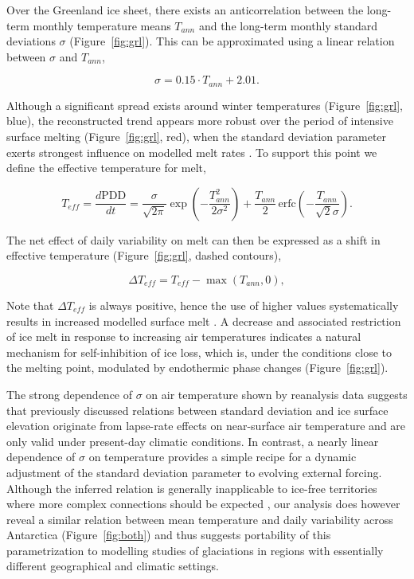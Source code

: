 \documentclass[review]{igs}
\begin{document}
Over the Greenland ice sheet, there exists an anticorrelation between the long-term monthly temperature means $T_{ann}$ and the long-term monthly standard deviations $\sigma$ (Figure~\ref{fig:grl}). This can be approximated using a linear relation between $\sigma$ and $T_{ann}$,

\begin{equation} \label{eq:sigma}
    \sigma = 0.15 \cdot T_{ann} + 2.01.
\end{equation}

Although a significant spread exists around winter temperatures (Figure~\ref{fig:grl}, blue), the reconstructed trend appears more robust over the period of intensive surface melting (Figure~\ref{fig:grl}, red), when the standard deviation parameter exerts strongest influence on modelled melt rates \citep{rogozhina-rau-inpress}. To support this point we define the effective temperature for melt,

\begin{equation} \label{eq:teff}
    T_{eff} = \frac{d\mathrm{PDD}}{dt}
        = \frac{\sigma}{\sqrt{2\pi}} \exp\left({-\frac{T_{ann}^2}{2\sigma^2}}\right)
            + \frac{T_{ann}}{2} \, \mathrm{erfc} \left(-\frac{T_{ann}}{\sqrt{2}\sigma}\right).
\end{equation}

The net effect of daily variability on melt can then be expressed as a shift in effective temperature (Figure~\ref{fig:grl}, dashed contours),

\begin{equation} \label{eq:dteff}
    \Delta T_{eff} = T_{eff} - \max(T_{ann}, 0),
\end{equation}

Note that $\Delta T_{eff}$ is always positive, hence the use of higher values systematically results in increased modelled surface melt \citep{rogozhina-rau-inpress}. A decrease and associated restriction of ice melt in response to increasing air temperatures indicates a natural mechanism for self-inhibition of ice loss, which is, under the conditions close to the melting point, modulated by endothermic phase changes (Figure~\ref{fig:grl}).

The strong dependence of $\sigma$ on air temperature shown by reanalysis data suggests that previously discussed relations between standard deviation and ice surface elevation \citep{fausto-etal-2009,fausto-etal-2011} originate from lapse-rate effects on near-surface air temperature and are only valid under present-day climatic conditions. In contrast, a nearly linear dependence of $\sigma$ on temperature provides a simple recipe for a dynamic adjustment of the standard deviation parameter to evolving external forcing. Although the inferred relation is generally inapplicable to ice-free territories where more complex connections should be expected \citep{seguinot-2013}, our analysis does however reveal a similar relation between mean temperature and daily variability across Antarctica (Figure~\ref{fig:both}) and thus suggests portability of this parametrization to modelling studies of glaciations in regions with essentially different geographical and climatic settings.
\end{document}
